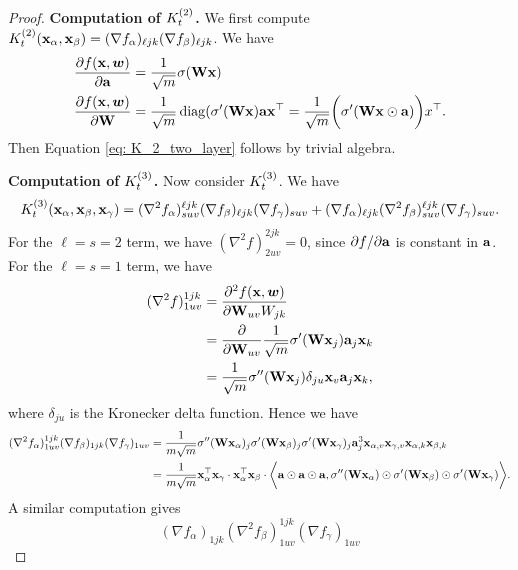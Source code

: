 \begin{proof}
	{\bf Computation of ${K}^{(2)}_t$.} We first compute ${K}^{(2)}_t({\mathbf{x}}_\alpha,{\mathbf{x}}_\beta) = (\nabla f_\alpha)_{\ell j k } (\nabla f_\beta)_{\ell j k}$. We have
	\begin{align*}
		\frac{\partial f({\mathbf{x}} , {\boldsymbol{w}})}{\partial {\mathbf{a}} } & =  \frac{1}{\sqrt{m}} \sigma({\mathbf{W}} {\mathbf{x}}) \\
		\frac{\partial f({\mathbf{x}} , {\boldsymbol{w}})}{\partial {\mathbf{W}}} & = \frac{1}{\sqrt{m}} \operatorname{diag}(\sigma'({\mathbf{W}} {\mathbf{x}})  {\mathbf{a}} {\mathbf{x}}^\top = \frac{1}{\sqrt{m}} \bigg(\sigma'({\mathbf{W}} {\mathbf{x}} \odot {\mathbf{a}} )\bigg) x^\top.
	\end{align*}
	Then Equation \eqref{eq: K_2_two_layer} follows by trivial algebra. 

	{\bf Computation of ${K}^{(3)}_t$.} Now consider ${K}^{(3)}_t$. We have
	\begin{align*}
		{K}^{(3)}_t({\mathbf{x}}_\alpha,{\mathbf{x}}_\beta,{\mathbf{x}}_\gamma) = (\nabla^2 f_\alpha)^{\ell j k }_{suv} (\nabla f_\beta)_{\ell j k} (\nabla f_\gamma)_{suv}  + (\nabla f_\alpha)_{\ell j k } (\nabla^2 f_\beta)^{\ell j k}_{s u v} (\nabla f_\gamma)_{suv}.
	\end{align*}
	For the $\ell = s = 2$ term, we have $(\nabla^2 f)^{2 j k}_{2 u v} = 0$, since $\partial f/ \partial {\mathbf{a}} $ is constant in ${\mathbf{a}}$. For the $\ell = s = 1$ term, we have
	\begin{align*}
		(\nabla^2 f)^{1 j k}_{1 u v} & = \frac{\partial^2 f({\mathbf{x}} , {\boldsymbol{w}})}{\partial {\mathbf{W}}_{uv} W_{jk}} \\
		& = \frac{\partial }{\partial {\mathbf{W}}_{uv}} \frac{1}{\sqrt{m}} \sigma'({\mathbf{W}} {\mathbf{x}}_j) {\mathbf{a}}_j{\mathbf{x}}_k \\
		& = \frac{1}{\sqrt{m}} \sigma''({\mathbf{W}} {\mathbf{x}}_j) \delta_{ju}{\mathbf{x}}_v {\mathbf{a}}_j{\mathbf{x}}_k,
	\end{align*}
	where $\delta_{ju}$ is the Kronecker delta function. Hence we have
	\begin{align*}
		(\nabla^2 f_\alpha)^{1 j k }_{1uv} (\nabla f_\beta)_{1 j k} (\nabla f_\gamma)_{1uv} & =  \frac{1}{m\sqrt{m}} \sigma''({\mathbf{W}} {\mathbf{x}}_\alpha)_j \sigma'({\mathbf{W}} {\mathbf{x}}_\beta)_j \sigma'({\mathbf{W}} {\mathbf{x}}_\gamma)_j {\mathbf{a}}_j^3{\mathbf{x}}_{\alpha, v}{\mathbf{x}}_{\gamma, v}{\mathbf{x}}_{\alpha, k}{\mathbf{x}}_{\beta, k} \\
		& = \frac{1}{m\sqrt{m}}{\mathbf{x}}_\alpha^\top{\mathbf{x}}_\gamma \cdot {\mathbf{x}}_\alpha^\top{\mathbf{x}}_\beta \cdot \bigg\langle {\mathbf{a}} \odot  {\mathbf{a}}\odot {\mathbf{a}} , \sigma''({\mathbf{W}} {\mathbf{x}}_\alpha)\odot \sigma'({\mathbf{W}} {\mathbf{x}}_\beta)\odot \sigma'({\mathbf{W}} {\mathbf{x}}_\gamma) \bigg\rangle.
	\end{align*}
	A similar computation gives
	\[
		(\nabla f_\alpha)_{1 j k } (\nabla^2 f_\beta)^{1 j k}_{1uv} (\nabla f_\gamma)_{1uv}
\]
\end{proof}
